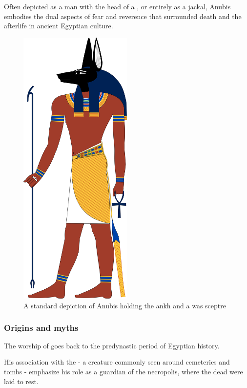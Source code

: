 Often depicted as a man with the head of a , or entirely as a jackal, Anubis embodies the dual aspects of fear and reverence that surrounded death and the afterlife in ancient Egyptian culture.

\begin{figure} [H]
	\centering
	\includegraphics[width=0.5\textwidth]{../images/anubis}
	\caption{A standard depiction of Anubis holding the ankh and a was sceptre}
\end{figure}

\subsubsection*{Origins and myths}
The worship of  goes back to the predynastic period of Egyptian history.

His association with the  - a creature commonly seen around cemeteries and tombs - emphasize his role as a guardian of the necropolis, where the dead were laid to rest.

